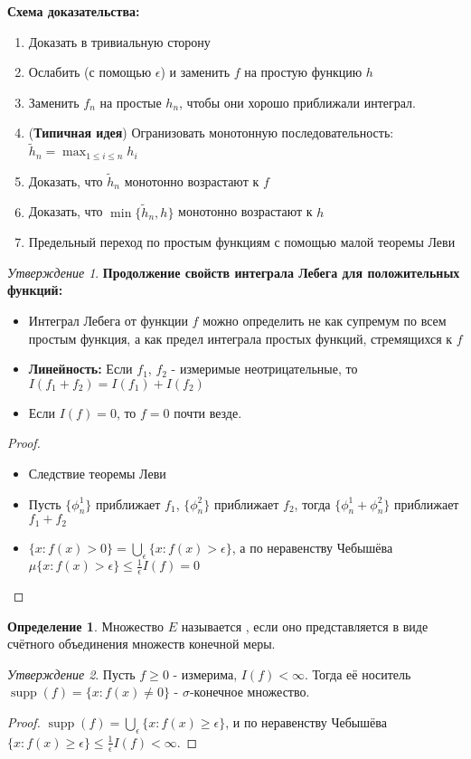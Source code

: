 \documentclass[a4paper]{article}
\theoremstyle{indented}
\theoremstyle{definition}
\newtheorem{defn}{Определение}
\theoremstyle{remark}
\newtheorem{stat}{Утверждение}
\DeclareMathOperator{\supp}{supp}
\begin{document}
\textbf{Схема доказательства: }
\begin{enumerate}
    \item Доказать в тривиальную сторону
    \item Ослабить (с помощью $\epsilon$) и заменить $f$ на простую функцию $h$
    \item Заменить $f_n$ на простые $h_n$, чтобы они хорошо приближали интеграл.
    \item (\textbf{Типичная идея}) Огранизовать монотонную последовательность: $\tilde{h}_n = \max_{1 \leq i \leq n} h_i$
    \item Доказать, что $\tilde{h}_n$ монотонно возрастают к $f$
    \item Доказать, что $\min\{\tilde{h}_n, h\}$ монотонно возрастают к $h$
    \item Предельный переход по простым функциям с помощью малой теоремы Леви
\end{enumerate}
\begin{stat}
\textbf{Продолжение свойств интеграла Лебега для положительных функций:}
\begin{itemize}
    \item Интеграл Лебега от функции $f$ можно определить не как супремум по всем простым функция, а как предел интеграла простых функций, стремящихся к $f$
    \item \textbf{Линейность:} Если $f_1$, $f_2$ - измеримые неотрицательные, то $I(f_1+f_2)=I(f_1)+I(f_2)$
    \item Если $I(f)=0$, то $f=0$ почти везде.
\end{itemize}
\end{stat}
\begin{proof}
\
\begin{itemize}
    \item Следствие теоремы Леви
    \item Пусть $\{\phi^1_n\}$ приближает $f_1$, $\{\phi^2_n\}$ приближает $f_2$, тогда $\{\phi^1_n+\phi^2_n\}$ приближает $f_1+f_2$
    \item $\{x: f(x)>0\} = \bigcup_{\epsilon} \{x: f(x)>\epsilon\}$, а по неравенству Чебышёва $\mu\{x: f(x)>\epsilon\} \leq \frac{1}{\epsilon}I(f)=0$ 
\end{itemize}
\end{proof}
\begin{defn}
Множество $E$ называется , если оно представляется в виде счётного объединения множеств конечной меры.
\end{defn}
\begin{stat}
Пусть $f \geq 0$ - измерима, $I(f) < \infty$. Тогда её носитель $\supp(f) = \{x : f(x) \neq 0\}$ - $\sigma$-конечное множество.
\end{stat}
\begin{proof}
$\supp(f) = \bigcup_{\epsilon} \{x : f(x) \geq  \epsilon\}$, и по неравенству Чебышёва $\{x : f(x) \geq  \epsilon\} \leq \frac{1}{\epsilon}I(f) < \infty$.
\end{proof}
 
\end{document}

